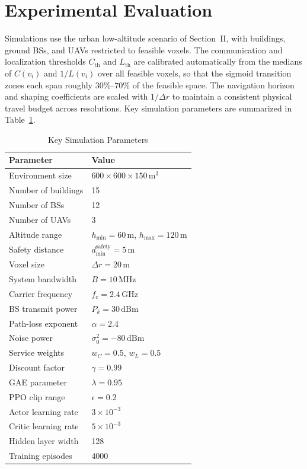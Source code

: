 \documentclass[lettersize,journal]{IEEEtran}
\begin{document}
\section{Experimental Evaluation}

Simulations use the urban low-altitude scenario of Section~II, with buildings, ground BSs, and UAVs restricted to feasible voxels. The communication and localization thresholds $C_{\mathrm{th}}$ and $L_{\mathrm{th}}$ are calibrated automatically from the medians of $C(v_i)$ and $1/L(v_i)$ over all feasible voxels, so that the sigmoid transition zones each span roughly $30\%$--$70\%$ of the feasible space. The navigation horizon and shaping coefficients are scaled with $1/\Delta r$ to maintain a consistent physical travel budget across resolutions. Key simulation parameters are summarized in Table~\ref{tab:params}.

\begin{table}[t]
\centering
\caption{Key Simulation Parameters}
\label{tab:params}
\scriptsize
\begin{tabular}{l|l}
\hline
\textbf{Parameter} & \textbf{Value} \\
\hline
Environment size & $600\times600\times150\,\mathrm{m}^3$ \\
Number of buildings & 15 \\
Number of BSs & 12 \\
Number of UAVs & 3 \\
Altitude range & $h_{\min}=60\,\mathrm{m}$, $h_{\max}=120\,\mathrm{m}$ \\
Safety distance & $d_{\min}^{\mathrm{safety}}=5\,\mathrm{m}$ \\
Voxel size & $\Delta r=20\,\mathrm{m}$ \\
System bandwidth & $B=10\,\mathrm{MHz}$ \\
Carrier frequency & $f_c=2.4\,\mathrm{GHz}$ \\
BS transmit power & $P_k=30\,\mathrm{dBm}$ \\
Path-loss exponent & $\alpha=2.4$ \\
Noise power & $\sigma_0^2=-80\,\mathrm{dBm}$ \\
Service weights & $w_C=0.5$, $w_L=0.5$ \\
Discount factor & $\gamma=0.99$ \\
GAE parameter & $\lambda=0.95$ \\
PPO clip range & $\epsilon=0.2$ \\
Actor learning rate & $3\times10^{-3}$ \\
Critic learning rate & $5\times10^{-3}$ \\
Hidden layer width & 128 \\
Training episodes & 4000 \\ 
\hline
\end{tabular}
\end{table}
\end{document}
